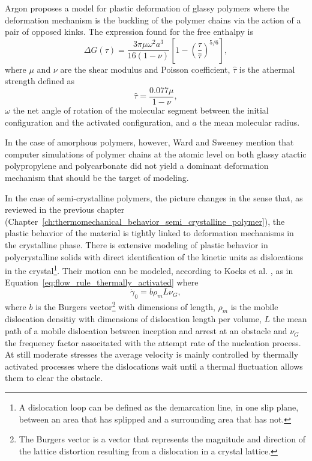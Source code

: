 Argon \citep{argonTheoryLowtemperaturePlastic1973} proposes a model for plastic deformation of glassy polymers where the deformation mechanism is the buckling of the polymer chains via the action of a pair of opposed kinks.
The expression found for the free enthalpy is
\begin{equation}
	\label{eq:argon_model_free_enthalpy}
	\Delta G(\tau)=\frac{3 \pi \mu \omega^2 a^3}{16(1-\nu)}\left[1-\left(\frac{\tau}{\hat \tau}\right)^{5 / 6}\right],
\end{equation}
where $\mu$ and $\nu$ are the shear modulus and Poisson coefficient, $\hat \tau$ is the athermal strength defined as
\begin{equation}
	\hat \tau = \frac{0.077 \mu}{1-\nu},
\end{equation}
$\omega$ the net angle of rotation of the molecular segment between the initial configuration and the activated configuration, and $a$ the mean molecular radius.

In the case of amorphous polymers, however, Ward and Sweeney \citep{wardIntroductionMechanicalProperties2004} mention that computer simulations of polymer chains at the atomic level on both glassy atactic polypropylene and polycarbonate did not yield a dominant deformation mechanism that should be the target of modeling.

In the case of semi-crystalline polymers, the picture changes in the sense that, as reviewed in the previous chapter (Chapter~\ref{ch:thermomechanical_behavior_semi_crystalline_polymer}), the plastic behavior of the material is tightly linked to deformation mechanisms in the crystalline phase.
There is extensive modeling of plastic behavior in polycrystalline solids with direct identification of the kinetic units as dislocations in the crystal\footnote{A dislocation loop can be defined as the demarcation line, in one slip plane, between an area that has splipped and a surrounding area that has not.}.
Their motion can be modeled, according to Kocks et al. \citep{kocks1975thermodynamics}, as in Equation~\eqref{eq:flow_rule_thermally_activated} where
\begin{equation}
	\label{eq:pre_exponential_def}
	\dot \gamma_0 = b\rho_m L \nu_G,
\end{equation}
where $b$ is the Burgers vector\footnote{The Burgers vector is a vector that represents the magnitude and direction of the lattice distortion resulting from a dislocation in a crystal lattice.} with dimensions of length, $\rho_m$ is the mobile dislocation densitiy with dimensions of dislocation length per volume, $L$ the mean path of a mobile dislocation between inception and arrest at an obstacle and $\nu_G$ the frequency factor associtated with the attempt rate of the nucleation process.
At still moderate stresses the average velocity is mainly controlled by thermally activated processes where the dislocations wait until a thermal fluctuation allows them to clear the obstacle.

